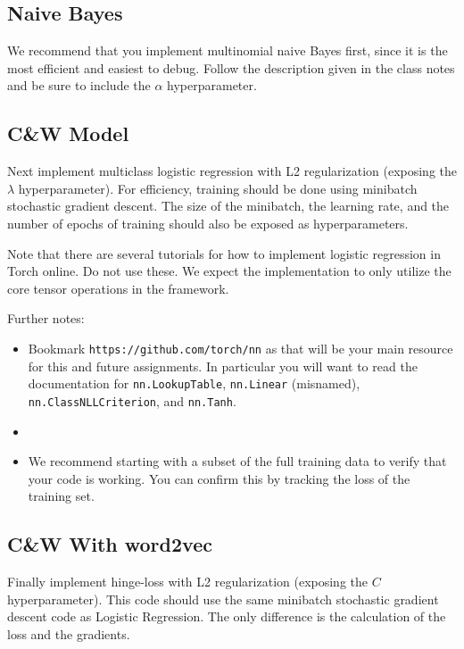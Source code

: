 \documentclass[11pt]{article}
\begin{document}
\subsection{Naive Bayes}

We recommend that you implement multinomial naive Bayes first, since
it is the most efficient and easiest to debug. Follow the description
given in the class notes and be sure to include the $\alpha$
hyperparameter.

\subsection{C\&W Model}

Next implement multiclass logistic regression with L2 regularization
(exposing the $\lambda$ hyperparameter). For efficiency, training
should be done using minibatch stochastic gradient descent. The size
of the minibatch, the learning rate, and the number of epochs of
training should also be exposed as hyperparameters.

Note that there are several tutorials for how to implement logistic
regression in Torch online. Do not use these. We expect the
implementation to only utilize the core tensor operations in the
framework.

Further notes:

\begin{itemize}
\item Bookmark \texttt{https://github.com/torch/nn} as that will be
  your main resource for this and future assignments. In particular
  you will want to read the documentation for \texttt{nn.LookupTable},
  \texttt{nn.Linear} (misnamed), \texttt{nn.ClassNLLCriterion}, and
  \texttt{nn.Tanh}.

\item 

\item We recommend starting with a subset of the full training data to
  verify that your code is working. You can confirm this by tracking
  the loss of the training set.
\end{itemize}

\subsection{C\&W With word2vec}

Finally implement hinge-loss with L2 regularization (exposing the $C$
hyperparameter). This code should use the same minibatch stochastic
gradient descent code as Logistic Regression. The only difference is
the calculation of the loss and the gradients. 
\end{document}

